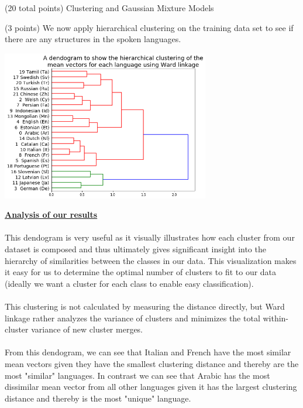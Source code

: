\documentclass[12pt]{article}
\begin{document}
\begin{question}{(20 total points) Clustering and Gaussian Mixture Models}
\begin{subquestion}
   \end{subquestion}
   \begin{subquestion}{(3 points)
       We now apply hierarchical clustering on the training data set
       to see if there are any structures in the spoken languages.
     } \label{Q3.3}


     

      \begin{answerbox}{35em}
        \begin{center}
        \includegraphics[width=0.68\textwidth]{images/q33.png}
        \end{center}
        \footnotesize{\textbf{\underline{Analysis of our results}}}\\
\\
        \scriptsize{
        This dendogram is very useful as it visually illustrates how each cluster from our dataset is composed and thus ultimately gives significant insight into the hierarchy of similarities between the classes in our data. This visualization makes it easy for us to determine the optimal number of clusters to fit to our data (ideally we want a cluster for each class to enable easy classification).\\
\\
        This clustering is not calculated by measuring the distance directly, but Ward linkage rather analyzes the variance of clusters and minimizes the total within-cluster variance of new cluster merges.\\
        \\
        From this dendogram, we can see that Italian and French have the most similar mean vectors given they have the smallest clustering distance and thereby are the most "similar" languages. In contrast we can see that Arabic has the most dissimilar mean vector from all other languages given it has the largest clustering distance and thereby is the most "unique" language.\\
}
\end{answerbox}
\end{subquestion}
\end{question}
\end{document}

